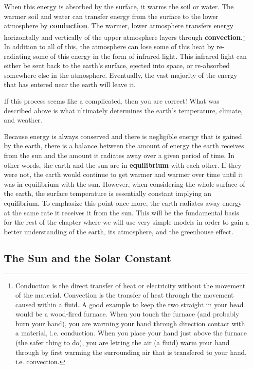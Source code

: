     When this energy is absorbed by the surface, it warms the soil or water. The warmer soil and water can transfer energy from the surface to the lower atmosphere by \textbf{conduction}. The warmer, lower atmosphere transfers energy horizontally and vertically of the upper atmosphere layers through \textbf{convection}.\footnote{
        Conduction is the direct transfer of heat or electricity without the movement of the material. Convection is the transfer of heat through the movement caused within a fluid. A good example to keep the two straight in your head would be a wood-fired furnace. When you touch the furnace (and probably burn your hand), you are warming your hand through direction contact with a material, i.e. conduction. When you place your hand just above the furnace (the safer thing to do), you are letting the air (a fluid) warm your hand through by first warming the surrounding air that is transfered to your hand, i.e. convection.
        } 
    In addition to all of this, the atmosphere can lose some of this heat by re-radiating some of this energy in the form of infrared light. This infrared light can either be sent back to the earth's surface, ejected into space, or re-absorbed somewhere else in the atmosphere. Eventually, the vast majority of the energy that has entered near the earth will leave it. 

    If this process seems like a complicated, then you are correct! What was described above is what ultimately determines the earth's temperature, climate, and weather.

    Because energy is always conserved and there is negligible energy that is gained by the earth, there is a balance between the amount of energy the earth receives from the sun and the amount it radiates away over a given period of time. In other words, the earth and the sun are in \textbf{equilibrium} with each other.\cite{thorndike1976energy} If they were not, the earth would continue to get warmer and warmer over time until it was in equilibrium with the sun. However, when considering the whole surface of the earth, the surface temperature is essentially constant implying an equilibrium. To emphasize this point once more, the earth radiates away energy at the same rate it receives it from the sun. This will be the fundamental basis for the rest of the chapter where we will use very simple models in order to gain a better understanding of the earth, its atmosphere, and the greenhouse effect.


        \subsection{The Sun and the Solar Constant} %
        \label{sub:the_sun}
        
